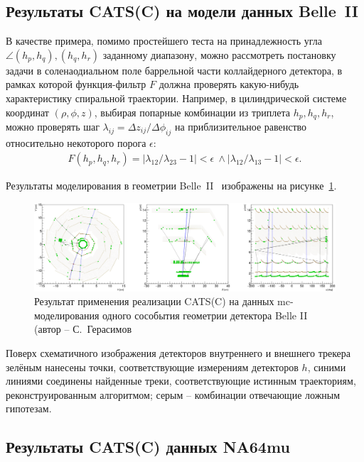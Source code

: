 \subsection{Результаты CATS(C) на модели данных Belle~II}

В качестве примера, помимо простейшего теста на принадлежность угла
$\angle(h_p,h_q),(h_q,h_r)$ заданному диапазону, можно рассмотреть
постановку задачи в соленаодиальном поле баррельной части коллайдерного
детектора, в рамках которой функция-фильтр $F$ должна проверять
какую-нибудь характеристику спиральной траектории. Например, в цилиндрической системе
координат $(\rho, \phi, z)$, выбирая попарные комбинации из триплета $h_{p}, h_q, h_{r}$,
можно проверять шаг $\lambda_{ij} = \Delta z_{ij}/\Delta \phi_{ij}$
на приблизительное равенство относительно некоторого порога $\epsilon$:
\begin{align}
    F(h_{p}, h_q, h_{r}) = |\lambda_{12} / \lambda_{23} - 1| <\epsilon ~
    \wedge |\lambda_{12} / \lambda_{13} - 1| <\epsilon.
\end{align}

Результаты моделирования в геометрии Belle~II~\cite{belle-ii} изображены на
рисунке~\ref{fig:belle-ii-mc-event}.
\begin{figure}[ht]
    \centering
    \includegraphics[width=1\linewidth]{images//illustrative/belle-ii-mc-event.png}
    \caption{Результат применения реализации CATS(C) на данных \acrshort{mc}-моделирования
    одного сособытия геометрии детектора Belle II~\cite{belle-ii} 
    (автор -- С.~Герасимов}
    \label{fig:belle-ii-mc-event}
\end{figure}
Поверх схематичного изображения детекторов
внутреннего и внешнего трекера зелёным нанесены точки, соответствующие
измерениям детекторов $h$, синими линиями соединены найденные треки,
соответствующие истинным траекториям, реконструированным алгоритмом;
серым -- комбинации отвечающие ложным гипотезам.

\subsection{Результаты CATS(C) данных NA64mu}

